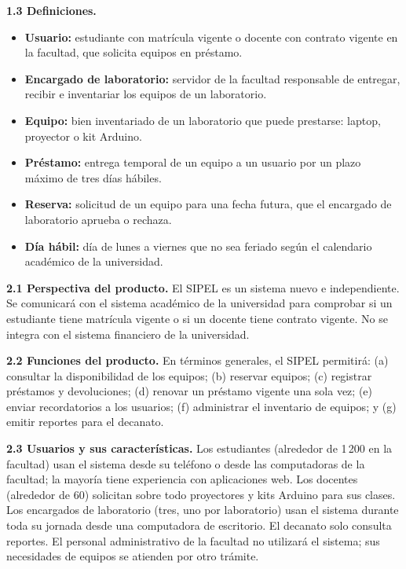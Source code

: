 \documentclass[11pt]{article}
\begin{document}
\textbf{1.3 Definiciones.}

\begin{itemize}[leftmargin=18pt,itemsep=2pt]
	\item \textbf{Usuario:} estudiante con matrícula vigente o docente con contrato vigente en la facultad, que solicita equipos en préstamo.
	\item \textbf{Encargado de laboratorio:} servidor de la facultad responsable de entregar, recibir e inventariar los equipos de un laboratorio.
	\item \textbf{Equipo:} bien inventariado de un laboratorio que puede prestarse: laptop, proyector o kit Arduino.
	\item \textbf{Préstamo:} entrega temporal de un equipo a un usuario por un plazo máximo de tres días hábiles.
	\item \textbf{Reserva:} solicitud de un equipo para una fecha futura, que el encargado de laboratorio aprueba o rechaza.
	\item \textbf{Día hábil:} día de lunes a viernes que no sea feriado según el calendario académico de la universidad.
\end{itemize}

\par\vspace{4pt}

\textbf{2.1 Perspectiva del producto.} El SIPEL es un sistema nuevo e independiente. Se comunicará con el sistema académico de la universidad para comprobar si un estudiante tiene matrícula vigente o si un docente tiene contrato vigente. No se integra con el sistema financiero de la universidad.

\textbf{2.2 Funciones del producto.} En términos generales, el SIPEL permitirá: (a) consultar la disponibilidad de los equipos; (b) reservar equipos; (c) registrar préstamos y devoluciones; (d) renovar un préstamo vigente una sola vez; (e) enviar recordatorios a los usuarios; (f) administrar el inventario de equipos; y (g) emitir reportes para el decanato.

\textbf{2.3 Usuarios y sus características.} Los estudiantes (alrededor de 1\,200 en la facultad) usan el sistema desde su teléfono o desde las computadoras de la facultad; la mayoría tiene experiencia con aplicaciones web. Los docentes (alrededor de 60) solicitan sobre todo proyectores y kits Arduino para sus clases. Los encargados de laboratorio (tres, uno por laboratorio) usan el sistema durante toda su jornada desde una computadora de escritorio. El decanato solo consulta reportes. El personal administrativo de la facultad no utilizará el sistema; sus necesidades de equipos se atienden por otro trámite.
\end{document}
